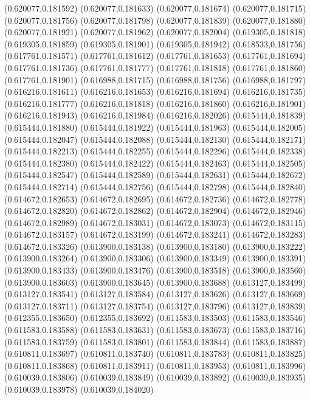 (0.620077,0.181592)
(0.620077,0.181633)
(0.620077,0.181674)
(0.620077,0.181715)
(0.620077,0.181756)
(0.620077,0.181798)
(0.620077,0.181839)
(0.620077,0.181880)
(0.620077,0.181921)
(0.620077,0.181962)
(0.620077,0.182004)
(0.619305,0.181818)
(0.619305,0.181859)
(0.619305,0.181901)
(0.619305,0.181942)
(0.618533,0.181756)
(0.617761,0.181571)
(0.617761,0.181612)
(0.617761,0.181653)
(0.617761,0.181694)
(0.617761,0.181736)
(0.617761,0.181777)
(0.617761,0.181818)
(0.617761,0.181860)
(0.617761,0.181901)
(0.616988,0.181715)
(0.616988,0.181756)
(0.616988,0.181797)
(0.616216,0.181611)
(0.616216,0.181653)
(0.616216,0.181694)
(0.616216,0.181735)
(0.616216,0.181777)
(0.616216,0.181818)
(0.616216,0.181860)
(0.616216,0.181901)
(0.616216,0.181943)
(0.616216,0.181984)
(0.616216,0.182026)
(0.615444,0.181839)
(0.615444,0.181880)
(0.615444,0.181922)
(0.615444,0.181963)
(0.615444,0.182005)
(0.615444,0.182047)
(0.615444,0.182088)
(0.615444,0.182130)
(0.615444,0.182171)
(0.615444,0.182213)
(0.615444,0.182255)
(0.615444,0.182296)
(0.615444,0.182338)
(0.615444,0.182380)
(0.615444,0.182422)
(0.615444,0.182463)
(0.615444,0.182505)
(0.615444,0.182547)
(0.615444,0.182589)
(0.615444,0.182631)
(0.615444,0.182672)
(0.615444,0.182714)
(0.615444,0.182756)
(0.615444,0.182798)
(0.615444,0.182840)
(0.614672,0.182653)
(0.614672,0.182695)
(0.614672,0.182736)
(0.614672,0.182778)
(0.614672,0.182820)
(0.614672,0.182862)
(0.614672,0.182904)
(0.614672,0.182946)
(0.614672,0.182989)
(0.614672,0.183031)
(0.614672,0.183073)
(0.614672,0.183115)
(0.614672,0.183157)
(0.614672,0.183199)
(0.614672,0.183241)
(0.614672,0.183283)
(0.614672,0.183326)
(0.613900,0.183138)
(0.613900,0.183180)
(0.613900,0.183222)
(0.613900,0.183264)
(0.613900,0.183306)
(0.613900,0.183349)
(0.613900,0.183391)
(0.613900,0.183433)
(0.613900,0.183476)
(0.613900,0.183518)
(0.613900,0.183560)
(0.613900,0.183603)
(0.613900,0.183645)
(0.613900,0.183688)
(0.613127,0.183499)
(0.613127,0.183541)
(0.613127,0.183584)
(0.613127,0.183626)
(0.613127,0.183669)
(0.613127,0.183711)
(0.613127,0.183754)
(0.613127,0.183796)
(0.613127,0.183839)
(0.612355,0.183650)
(0.612355,0.183692)
(0.611583,0.183503)
(0.611583,0.183546)
(0.611583,0.183588)
(0.611583,0.183631)
(0.611583,0.183673)
(0.611583,0.183716)
(0.611583,0.183759)
(0.611583,0.183801)
(0.611583,0.183844)
(0.611583,0.183887)
(0.610811,0.183697)
(0.610811,0.183740)
(0.610811,0.183783)
(0.610811,0.183825)
(0.610811,0.183868)
(0.610811,0.183911)
(0.610811,0.183953)
(0.610811,0.183996)
(0.610039,0.183806)
(0.610039,0.183849)
(0.610039,0.183892)
(0.610039,0.183935)
(0.610039,0.183978)
(0.610039,0.184020)
